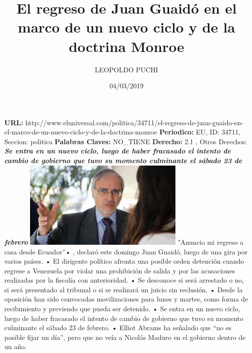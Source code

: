 \documentclass{article}%
\title{\textbf{El regreso de Juan Guaidó en el marco de un nuevo ciclo y de la doctrina Monroe}}%
\author{LEOPOLDO PUCHI}%
\date{04/03/2019}%
\begin{document}
%
\normalsize%
\maketitle%
\textbf{URL: }%
http://www.eluniversal.com/politica/34711/el{-}regreso{-}de{-}juan{-}guaido{-}en{-}el{-}marco{-}de{-}un{-}nuevo{-}ciclo{-}y{-}de{-}la{-}doctrina{-}monroe\newline%
%
\textbf{Periodico: }%
EU, %
ID: %
34711, %
Seccion: %
politica\newline%
%
\textbf{Palabras Claves: }%
NO\_TIENE\newline%
%
\textbf{Derecho: }%
2.1%
, Otros Derechos: %
\newline%
%
\textbf{\textit{Se entra en un nuevo ciclo, luego de haber fracasado el intento de cambio de gobierno que tuvo su momento culminante el sábado 23 de febrero}}%
\newline%
\newline%
%
\includegraphics[width=300px]{EU_34711.jpg}%
\newline%
%
"Anuncio mi regreso a casa desde Ecuador”•%
\newline%
%
, declaró este domingo Juan Guaidó, luego de una gira por varios países.%
\newline%
%
•	El dirigente político afronta una posible orden detención cuando regrese a Venezuela por violar una prohibición de salida y por las acusaciones realizadas por la fiscalía con anterioridad.%
\newline%
%
•	Se desconoce si será arrestado o no, si será presentado al tribunal o si se realizará un juicio sin reclusión.%
\newline%
%
•	Desde la oposición han sido convocadas movilizaciones para lunes y martes, como forma de recibimiento y previendo que pueda ser detenido.%
\newline%
%
•	Se entra en un nuevo ciclo, luego de haber fracasado el intento de cambio de gobierno que tuvo su momento culminante el sábado 23 de febrero.%
\newline%
%
•	Elliot Abrams ha señalado que “no es posible fijar un día”, pero que no veía a Nicolás Maduro en el gobierno dentro de un año.%
\end{document}
